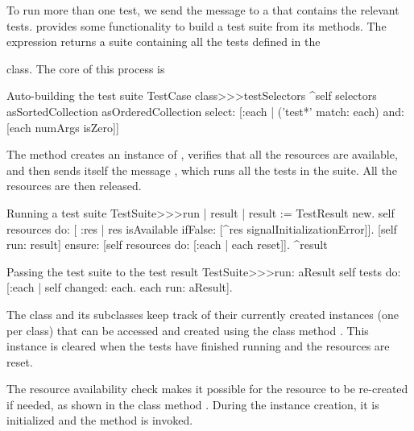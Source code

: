 \documentclass[a4paper,10pt,twoside]{book}
\begin{document}
To run more than one test, we send the message
 to a  that contains the relevant tests. 
 provides some functionality to build a test suite from
its methods.  The expression  returns a suite containing all the tests defined in the { class.
The core of this process is
\begin{method}[testcasetestselectors]{Auto-building the test suite}
TestCase class>>>testSelectors 
	^self selectors asSortedCollection asOrderedCollection select: [:each | 
		('test*' match: each) and: [each numArgs isZero]]
\end{method}

The method  creates an instance of
, verifies that all the resources are available, and then sends itself
the message , which runs all
the tests in the suite.  All the resources are then
released.
\begin{method}[testsuiterun]{Running a test suite}
TestSuite>>>run
	| result |
 	result := TestResult new.
	self resources do: [ :res |
		res isAvailable ifFalse: [^res signalInitializationError]].
	[self run: result] ensure: [self resources do: [:each | each reset]].
	^result
\end{method}

\begin{method}[testsuiterun:]{Passing the test suite to the test result}
TestSuite>>>run: aResult
	self tests do: [:each | 
		self changed: each.
		each run: aResult].
\end{method}
The class  and its subclasses keep track of
their currently created instances (one per class) that can be accessed
and created using the class method .  This instance is
cleared when the tests have finished running and the resources are
reset.

The resource availability check makes it possible for the resource to be 
re-created if needed, as shown in the class method .  During the 
instance creation, it is initialized and the method  is
invoked.


}
\end{document}
